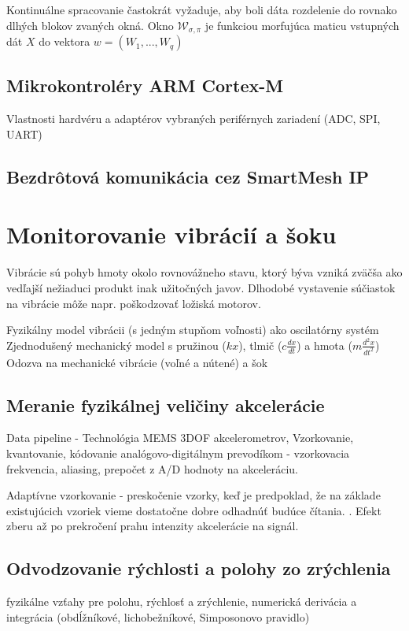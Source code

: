Kontinuálne spracovanie častokrát vyžaduje, aby boli dáta rozdelenie do rovnako dlhých blokov zvaných okná. Okno $\mathcal{W}_{\sigma, \pi}$ je funkciou morfujúca maticu vstupných dát $X$ do vektora $w = (W_1, ... , W_q)$  \cite{online-anomaly-detection} 

\subsection{Mikrokontroléry ARM Cortex-M}
Vlastnosti hardvéru a adaptérov vybraných periférnych zariadení (ADC, SPI, UART) 
\cite{cortex-m3}

\subsection{Bezdrôtová komunikácia cez SmartMesh IP}
\cite{smartmesh-ip}

\section{Monitorovanie vibrácií a šoku}
Vibrácie sú pohyb hmoty okolo rovnovážneho stavu, ktorý býva vzniká zväčša ako vedľajší nežiaduci produkt
inak užitočných javov. Dlhodobé vystavenie súčiastok na vibrácie môže napr. poškodzovať ložiská motorov.
 
Fyzikálny model vibrácii (s jedným stupňom voľnosti) ako oscilatórny systém
Zjednodušený mechanický model s pružinou ($kx$), tlmič ($c\frac{dx}{dt}$) a hmota ($m\frac{d^2x}{dt^2}$)
Odozva na mechanické vibrácie (voľné a nútené) a šok
\cite{vibrations-shock}
 
\subsection{Meranie fyzikálnej veličiny akcelerácie}
Data pipeline - Technológia MEMS 3DOF akcelerometrov, Vzorkovanie, kvantovanie, kódovanie analógovo-digitálnym prevodíkom - vzorkovacia frekvencia, aliasing, prepočet z A/D hodnoty na akceleráciu. \cite{mdof-mems-accelerometers} 

Adaptívne vzorkovanie - preskočenie vzorky, keď je predpoklad, že na základe existujúcich vzoriek vieme dostatočne dobre odhadnúť budúce čítania. \cite{adaptive-sampling}. Efekt zberu až po prekročení prahu intenzity akcelerácie na signál.

\subsection{Odvodzovanie rýchlosti a polohy zo zrýchlenia}
fyzikálne vzťahy pre polohu, rýchlosť a zrýchlenie, numerická derivácia a integrácia (obdĺžníkové, lichobežníkové, Simposonovo pravidlo) \cite{integration-acceleration-envelopes}

